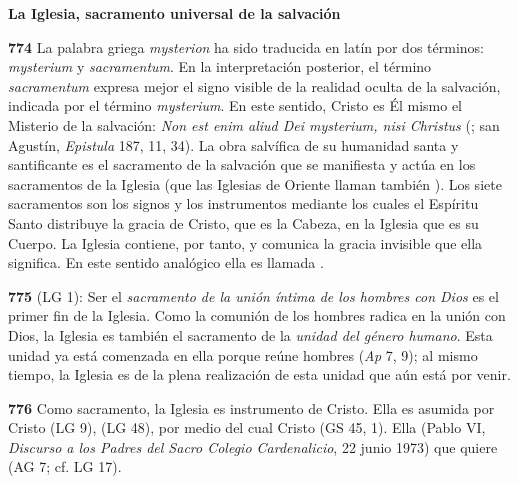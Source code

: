 {\textbf{La Iglesia, sacramento universal de la salvación}

\textbf{774} La palabra griega \emph{mysterion} ha sido traducida en latín por dos términos: \emph{mysterium} y \emph{sacramentum}. En la interpretación posterior, el término \emph{sacramentum} expresa mejor el signo visible de la realidad oculta de la salvación, indicada por el término \emph{mysterium}. En este sentido, Cristo es Él mismo el Misterio de la salvación: \emph{Non est enim aliud Dei mysterium, nisi Christus} (; san Agustín, \emph{Epistula} 187, 11, 34). La obra salvífica de su humanidad santa y santificante es el sacramento de la salvación que se manifiesta y actúa en los sacramentos de la Iglesia (que las Iglesias de Oriente llaman también ). Los siete sacramentos son los signos y los instrumentos mediante los cuales el Espíritu Santo distribuye la gracia de Cristo, que es la Cabeza, en la Iglesia que es su Cuerpo. La Iglesia contiene, por tanto, y comunica la gracia invisible que ella significa. En este sentido analógico ella es llamada .

\textbf{775}  (LG 1): Ser el \emph{sacramento de la unión íntima de los hombres con Dios} es el primer fin de la Iglesia. Como la comunión de los hombres radica en la unión con Dios, la Iglesia es también el sacramento de la \emph{unidad del género humano}. Esta unidad ya está comenzada en ella porque reúne hombres  (\emph{Ap} 7, 9); al mismo tiempo, la Iglesia es  de la plena realización de esta unidad que aún está por venir.

\textbf{776} Como sacramento, la Iglesia es instrumento de Cristo. Ella es asumida por Cristo  (LG 9),  (LG 48), por medio del cual Cristo  (GS 45, 1). Ella  (Pablo VI, \emph{Discurso a los Padres del Sacro Colegio Cardenalicio}, 22 junio 1973) que quiere  (AG 7; cf. LG 17).

}
